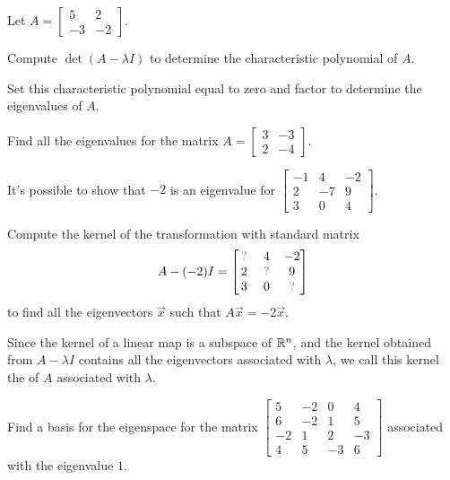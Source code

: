 \begin{activity}{10}
Let $A = \begin{bmatrix} 5 & 2 \\ -3 & -2 \end{bmatrix}$.
\begin{subactivity}
Compute $\det (A-\lambda I)$ to determine the characteristic polynomial of $A$.
\end{subactivity}
\begin{subactivity}
Set this characteristic polynomial equal to zero and factor to determine the eigenvalues of $A$.
\end{subactivity}
\end{activity}

\begin{activity}{10}
  Find all the eigenvalues for the matrix
  $A=\begin{bmatrix} 3 & -3 \\ 2 & -4 \end{bmatrix}$.
\end{activity}

\begin{activity}{10}
It's possible to show that \(-2\) is an eigenvalue for
\(\begin{bmatrix}-1&4&-2\\2&-7&9\\3&0&4\end{bmatrix}\).

\vspace{1em}

Compute the kernel of the transformation with standard matrix
\[
  A-(-2)I
    =
  \begin{bmatrix} \unknown & 4&-2 \\ 2 & \unknown & 9\\3&0&\unknown \end{bmatrix}
\] 
to find all the eigenvectors \(\vec x\) such that \(A\vec x=-2\vec x\).
\end{activity}

\begin{definition}
  Since the kernel of a linear map is a subspace
  of \(\mathbb{R}^n\), and the kernel obtained from \(A-\lambda I\)
  contains all the eigenvectors associated with \(\lambda\),
  we call this kernel the  of \(A\) associated with \(\lambda\).
\end{definition}


\begin{activity}{10}
Find a basis for the eigenspace for the matrix
\(
  \begin{bmatrix}
    5 & -2 & 0 & 4 \\ 6 & -2 & 1 & 5 \\ -2 & 1 & 2 & -3 \\ 4 & 5 & -3 & 6
  \end{bmatrix}
\)
associated with the eigenvalue \(1\).
\end{activity}


